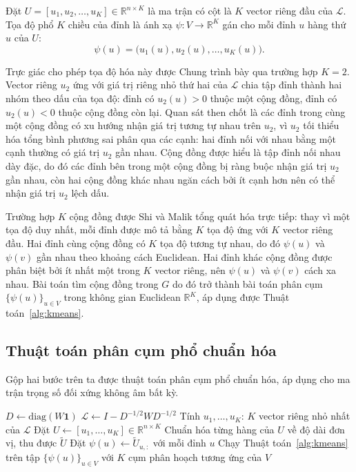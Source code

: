 \begin{definition}
\label{def:spectral-embedding}
Đặt $U = [u_1, u_2, \ldots, u_K] \in \mathbb{R}^{n \times K}$ là ma trận có cột là $K$ vector riêng đầu của $\mathcal{L}$. Tọa độ phổ $K$ chiều của đỉnh là ánh xạ $\psi: V \to \mathbb{R}^K$ gán cho mỗi đỉnh $u$ hàng thứ $u$ của $U$:
\[
    \psi(u) = \bigl( u_1(u), u_2(u), \ldots, u_K(u) \bigr).
\]
\end{definition}

Trực giác cho phép tọa độ hóa này được Chung \cite{chung1997} trình bày qua trường hợp $K = 2$. Vector riêng $u_2$ ứng với giá trị riêng nhỏ thứ hai của $\mathcal{L}$ chia tập đỉnh thành hai nhóm theo dấu của tọa độ: đỉnh có $u_2(u) > 0$ thuộc một cộng đồng, đỉnh có $u_2(u) < 0$ thuộc cộng đồng còn lại. Quan sát then chốt là các đỉnh trong cùng một cộng đồng có xu hướng nhận giá trị tương tự nhau trên $u_2$, vì $u_2$ tối thiểu hóa tổng bình phương sai phân qua các cạnh: hai đỉnh nối với nhau bằng một cạnh thường có giá trị $u_2$ gần nhau. Cộng đồng được hiểu là tập đỉnh nối nhau dày đặc, do đó các đỉnh bên trong một cộng đồng bị ràng buộc nhận giá trị $u_2$ gần nhau, còn hai cộng đồng khác nhau ngăn cách bởi ít cạnh hơn nên có thể nhận giá trị $u_2$ lệch dấu.

Trường hợp $K$ cộng đồng được Shi và Malik \cite{shi2000} tổng quát hóa trực tiếp: thay vì một tọa độ duy nhất, mỗi đỉnh được mô tả bằng $K$ tọa độ ứng với $K$ vector riêng đầu. Hai đỉnh cùng cộng đồng có $K$ tọa độ tương tự nhau, do đó $\psi(u)$ và $\psi(v)$ gần nhau theo khoảng cách Euclidean. Hai đỉnh khác cộng đồng được phân biệt bởi ít nhất một trong $K$ vector riêng, nên $\psi(u)$ và $\psi(v)$ cách xa nhau. Bài toán tìm cộng đồng trong $G$ do đó trở thành bài toán phân cụm $\{\psi(u)\}_{u \in V}$ trong không gian Euclidean $\mathbb{R}^K$, áp dụng được Thuật toán~\ref{alg:kmeans}.

\subsection{Thuật toán phân cụm phổ chuẩn hóa}
\label{subsec:full-algorithm}

Gộp hai bước trên ta được thuật toán phân cụm phổ chuẩn hóa, áp dụng cho ma trận trọng số đối xứng không âm bất kỳ.

\begin{algorithm}[H]
\caption{Phân cụm phổ chuẩn hóa cho $K$ cụm}
\label{alg:spectral-clustering}
$D \gets \mathrm{diag}(W \mathbf{1})$\;
$\mathcal{L} \gets I - D^{-1/2} W D^{-1/2}$\;
Tính $u_1, \ldots, u_K$: $K$ vector riêng nhỏ nhất của $\mathcal{L}$\;
Đặt $U \gets [u_1, \ldots, u_K] \in \mathbb{R}^{n \times K}$\;
Chuẩn hóa từng hàng của $U$ về độ dài đơn vị, thu được $\widetilde U$\;
Đặt $\psi(u) \gets \widetilde U_{u, :}$ với mỗi đỉnh $u$\;
Chạy Thuật toán~\ref{alg:kmeans} trên tập $\{\psi(u)\}_{u \in V}$ với $K$ cụm\;
\Return phân hoạch tương ứng của $V$\;
\end{algorithm}


